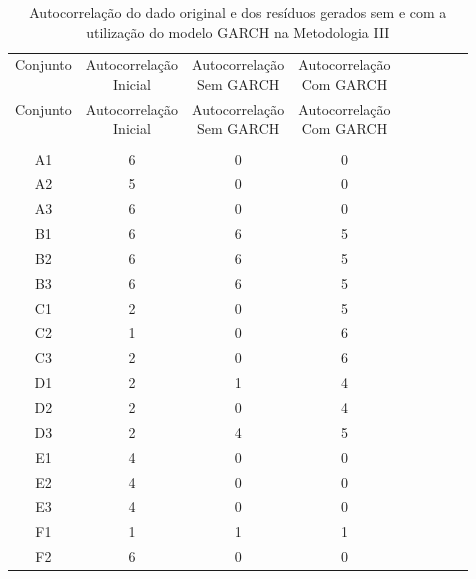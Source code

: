 \begin{center}
\begin{longtable}{ccccc|cccc}
\toprule
\rowcolor{white}
\caption[Metodologia III: evolução da autocorrelação]{Autocorrelação do dado
original e dos resíduos gerados sem e com a utilização do modelo GARCH na
Metodologia III} \label{tab:EvolucaoAutocorrelacaoMet3}\\
\midrule
Conjunto & \specialcell{Autocorrelação\\Inicial} & \specialcell{Autocorrelação\\Sem
GARCH} & \specialcell{Autocorrelação\\Com GARCH} \\
\midrule
\endfirsthead 
\midrule
\rowcolor{white}
Conjunto & \specialcell{Autocorrelação\\Inicial} & \specialcell{Autocorrelação\\Sem
GARCH} & \specialcell{Autocorrelação\\Com GARCH} \\
\toprule
\endhead
\midrule \\ %
\endfoot
\bottomrule 
\endlastfoot
    A1    & 6     & 0     & 0 \\
    A2    & 5     & 0     & 0 \\
    A3    & 6     & 0     & 0 \\
    B1    & 6     & 6     & 5 \\
    B2    & 6     & 6     & 5 \\
    B3    & 6     & 6     & 5 \\
    C1    & 2     & 0     & 5 \\
    C2    & 1     & 0     & 6 \\
    C3    & 2     & 0     & 6 \\
    D1    & 2     & 1     & 4 \\
    D2    & 2     & 0     & 4 \\
    D3    & 2     & 4     & 5 \\
    E1    & 4     & 0     & 0 \\
    E2    & 4     & 0     & 0 \\
    E3    & 4     & 0     & 0 \\
    F1    & 1     & 1     & 1 \\
    F2    & 6     & 0     & 0 \\

\end{longtable}
\end{center}
